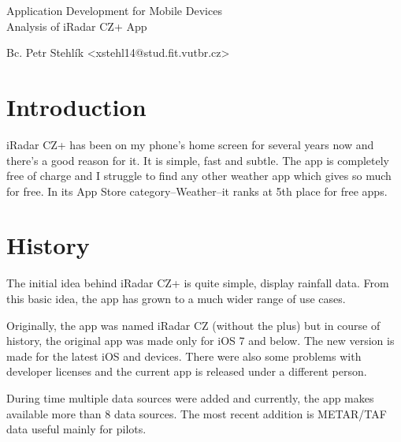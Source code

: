 \documentclass[11pt,a4paper]{article}
\begin{document}
\begin{center}
	\LARGE{Application Development for Mobile Devices}\\
	\Large{Analysis of iRadar CZ+ App}
	\vspace{0.5cm}

    \begin{centering}
    \small{
        Bc. Petr Stehlík <xstehl14@stud.fit.vutbr.cz>
        }
    \end{centering}

	\vspace{0.2cm}

\end{center}


\section{Introduction}

iRadar CZ+\cite{iradarplus} has been on my phone's home screen for several years now and there's a good reason for it. It is simple, fast and subtle. The app is completely free of charge and I struggle to find any other weather app which gives so much for free. In its App Store category--Weather--it ranks at 5th place for free apps.

\section{History}
The initial idea behind iRadar CZ+ is quite simple, display rainfall data. From this basic idea, the app has grown to a much wider range of use cases.

Originally, the app was named iRadar CZ\cite{iradar} (without the plus) but in course of history, the original app was made only for iOS 7 and below. The new version is made for the latest iOS and devices. There were also some problems with developer licenses and the current app is released under a different person.

During time multiple data sources were added and currently, the app makes available more than 8 data sources. The most recent addition is METAR/TAF\cite{metar} data useful mainly for pilots.
\end{document}
